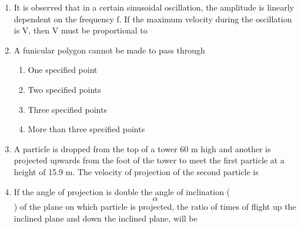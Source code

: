 \documentclass[11pt,a4paper]{article}
\begin{document}
\begin{enumerate}
\item{It is observed that in a certain sinusoidal oscillation, the amplitude is linearly dependent on the frequency f. If the maximum velocity during the oscillation is V, then V must be proportional to}
\\
\item{A funicular polygon cannot be made to pass through}
\begin{enumerate}[label=\Alph*.]
\item{One specified point}
\item{Two specified points}
\item{Three specified points}
\item{More than three specified points}
\end{enumerate}
\item{A particle is dropped from the top of a tower 60 m high and another is projected upwards from the foot of the tower to meet the first particle at a height of 15.9 m. The velocity of projection of the second particle is}
\\
\item{If the angle of projection is double the angle of inclination ($$\alpha $$) of the plane on which particle is projected, the ratio of times of flight up the inclined plane and down the inclined plane, will be
}
\\
\end{enumerate}
\end{document}
